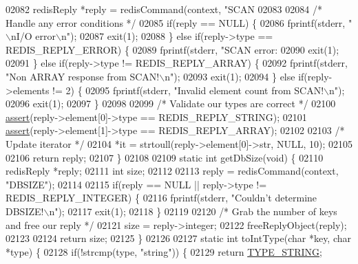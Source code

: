 \begin{DoxyCode}
{{{{{{{{{{{{{{{{{{{{{{{{{{{{{{{{{{{{{{{{{{{{{{{{{{{{{{{{{{{02082     redisReply *reply = redisCommand(context, \textcolor{stringliteral}{"SCAN %
02083 
02084     \textcolor{comment}{/* Handle any error conditions */}
02085     \textcolor{keywordflow}{if}(reply == NULL) \{
02086         fprintf(stderr, \textcolor{stringliteral}{"\(\backslash\)nI/O error\(\backslash\)n"});
02087         exit(1);
02088     \} \textcolor{keywordflow}{else} \textcolor{keywordflow}{if}(reply->type == REDIS\_REPLY\_ERROR) \{
02089         fprintf(stderr, \textcolor{stringliteral}{"SCAN error: %
02090         exit(1);
02091     \} \textcolor{keywordflow}{else} \textcolor{keywordflow}{if}(reply->type != REDIS\_REPLY\_ARRAY) \{
02092         fprintf(stderr, \textcolor{stringliteral}{"Non ARRAY response from SCAN!\(\backslash\)n"});
02093         exit(1);
02094     \} \textcolor{keywordflow}{else} \textcolor{keywordflow}{if}(reply->elements != 2) \{
02095         fprintf(stderr, \textcolor{stringliteral}{"Invalid element count from SCAN!\(\backslash\)n"});
02096         exit(1);
02097     \}
02098 
02099     \textcolor{comment}{/* Validate our types are correct */}
02100     \hyperlink{redisassert_8h_a993abaa2c168852c1592879472938781}{assert}(reply->element[0]->type == REDIS\_REPLY\_STRING);
02101     \hyperlink{redisassert_8h_a993abaa2c168852c1592879472938781}{assert}(reply->element[1]->type == REDIS\_REPLY\_ARRAY);
02102 
02103     \textcolor{comment}{/* Update iterator */}
02104     *it = strtoull(reply->element[0]->str, NULL, 10);
02105 
02106     \textcolor{keywordflow}{return} reply;
02107 \}
02108 
02109 \textcolor{keyword}{static} \textcolor{keywordtype}{int} getDbSize(\textcolor{keywordtype}{void}) \{
02110     redisReply *reply;
02111     \textcolor{keywordtype}{int} size;
02112 
02113     reply = redisCommand(context, \textcolor{stringliteral}{"DBSIZE"});
02114 
02115     \textcolor{keywordflow}{if}(reply == NULL || reply->type != REDIS\_REPLY\_INTEGER) \{
02116         fprintf(stderr, \textcolor{stringliteral}{"Couldn't determine DBSIZE!\(\backslash\)n"});
02117         exit(1);
02118     \}
02119 
02120     \textcolor{comment}{/* Grab the number of keys and free our reply */}
02121     size = reply->integer;
02122     freeReplyObject(reply);
02123 
02124     \textcolor{keywordflow}{return} size;
02125 \}
02126 
02127 \textcolor{keyword}{static} \textcolor{keywordtype}{int} toIntType(\textcolor{keywordtype}{char} *key, \textcolor{keywordtype}{char} *type) \{
02128     \textcolor{keywordflow}{if}(!strcmp(type, \textcolor{stringliteral}{"string"})) \{
02129         \textcolor{keywordflow}{return} \hyperlink{redis-cli_8c_a4e4e428e3a6a191834e3ff63bd301866}{TYPE\_STRING};
}}}}}}}}}}}}}}}}}}}}}}}}}}}}}}}}}}}}}}}}}}}}}}}}}}}}}}}}}}}}}
\end{DoxyCode}
